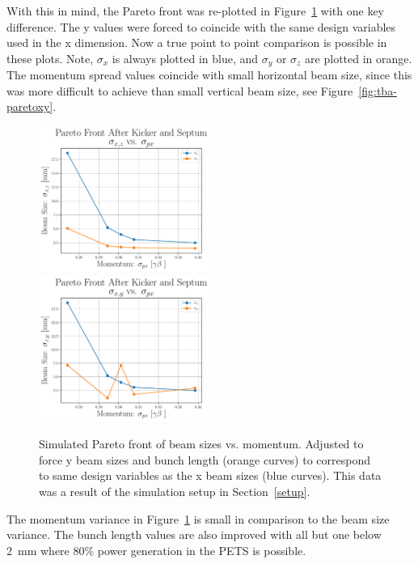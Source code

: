 With this in mind, the Pareto front was re-plotted in Figure~\ref{fig:tba-pareto} 
with one key difference. The y values were forced to coincide with the same 
design variables used in the x dimension. Now a true point to point comparison is possible in these plots.
Note, $\sigma_x$ is always plotted in blue, and $\sigma_y$ or $\sigma_z$ are plotted in orange.
The momentum spread values coincide with small horizontal beam size, 
since this was more difficult to achieve than small vertical beam size, see Figure~\ref{fig:tba-paretoxy}. 
\begin{figure}
	\centering
	\includegraphics[width=0.5\textwidth]{./images/xz_vs_px_pareto_front_Q5}%
	\includegraphics[width=0.5\textwidth]{images/xy_vs_px_pareto_front_Q5}
	\caption{Simulated Pareto front of beam sizes vs. momentum.
		Adjusted to force y beam sizes and bunch length (orange curves) to correspond to same design variables 
		as the x beam sizes (blue curves).
		This data was a result of the simulation setup in Section~\ref{setup}.}
	\label{fig:tba-pareto}
\end{figure}
The momentum variance in Figure~\ref{fig:tba-pareto} is small in comparison to 
the beam size variance. The bunch length values are also improved with all but one below \SI{2}{mm}
where 80\% power generation in the PETS is possible. 

